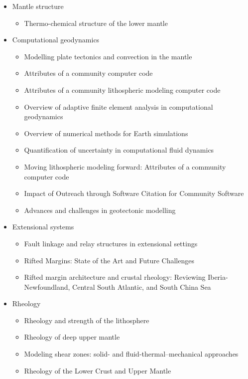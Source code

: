 \begin{itemize}
\item Mantle structure
   \begin{itemize}
   \item Thermo-chemical structure of the lower mantle \cite{dett07}
   \end{itemize}


\item Computational geodynamics
   \begin{itemize}
   \item Modelling plate tectonics and convection in the mantle \cite{mogz00}
   \item Attributes of a community computer code \cite{comc15}
   \item Attributes of a community lithospheric modeling computer code \cite{comc15}
   \item Overview of adaptive finite element analysis in computational geodynamics \cite{masm13}
   \item Overview of numerical methods for Earth simulations \cite{momd01}
   \item Quantification of uncertainty in computational fluid dynamics \cite{roac97}
   \item Moving lithospheric modeling forward: Attributes of a community computer code \cite{comc15}
   \item Impact of Outreach through Software Citation for Community Software \cite{hwpc19}
   \item Advances and challenges in geotectonic modelling \cite{bufy14}
   \end{itemize}

\item Extensional systems
   \begin{itemize}
   \item Fault linkage and relay structures in extensional settings \cite{foro16}
   \item Rifted Margins: State of the Art and Future Challenges \cite{pema19}\\
   \item Rifted margin architecture and crustal rheology: Reviewing
Iberia-Newfoundland, Central South Atlantic, and South China Sea \cite{brhc17}
   \end{itemize}

\item Rheology 
   \begin{itemize}
   \item Rheology and strength of the lithosphere \cite{kirb83,buro11}
   \item Rheology of deep upper mantle \cite{kara10}
   \item Modeling shear zones: solid- and fluid-thermal–mechanical approaches \cite{reyu03}
   \item Rheology of the Lower Crust and Upper Mantle \cite{budr08}
   \end{itemize}


\end{itemize}
